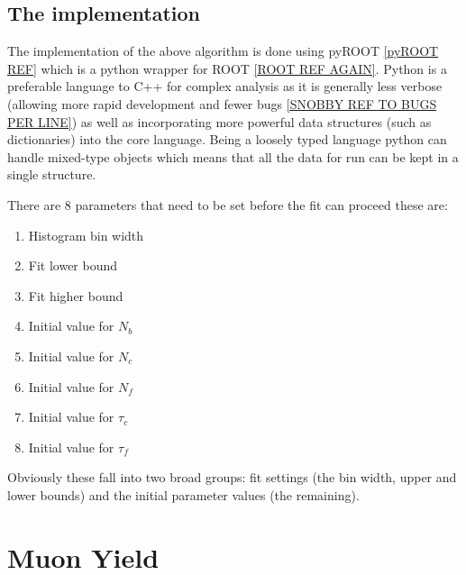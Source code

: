 \documentclass[]{article}
\begin{document}
\subsection{The implementation} %
\label{sub:the_implementation}
The implementation of the above algorithm is done using pyROOT \ref{pyROOT REF} which is a python wrapper for ROOT \ref{ROOT REF AGAIN}. Python is a preferable language to C++ for complex analysis as it is generally less verbose (allowing more rapid development and fewer bugs \ref{SNOBBY REF TO BUGS PER LINE}) as well as incorporating more powerful data structures (such as dictionaries) into the core language. Being a loosely typed language python can handle mixed-type objects which means that all the data for run can be kept in a single structure.

There are 8 parameters that need to be set before the fit can proceed these are:
\begin{enumerate}
    \item Histogram bin width
    \item Fit lower bound
    \item Fit higher bound
    \item Initial value for $N_{b}$
    \item Initial value for $N_{c}$
    \item Initial value for $N_{f}$
    \item Initial value for $\tau_{c}$
    \item Initial value for $\tau_{f}$
\end{enumerate}
Obviously these fall into two broad groups: fit settings (the bin width, upper and lower bounds) and the initial parameter values (the remaining). 
\section{Muon Yield} %
\label{sec:muon_yield}

\appendix
\end{document}
